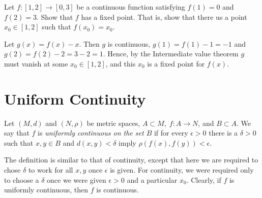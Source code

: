 \documentclass[../main-sheet.tex]{subfiles}
\begin{document}
\begin{prob}
    Let $ f:[1,2]\to[0,3] $ be a continuous function satisfying $ f(1)=0 $ and $ f(2)=3 $. Show that $ f $ has a fixed point. That is, show that there us a point $ x_0 \in [1,2] $ such that $ f(x_0)=x_0 $.
\end{prob}
\begin{soln}
    Let $ g(x)=f(x)-x $. Then $ g $ is continuous, $ g(1)=f(1)-1=-1$ and $ g(2)=f(2)-2=3-2=1 $. Hence, by the Intermediate value theorem $ g $ must vanish at some $ x_0\in[1,2] $, and this $ x_0 $ is a fixed point for $ f(x) $.
\end{soln}
\section{Uniform Continuity}
\begin{defn}
    Let $ (M,d) $ and $ (N,\rho) $ be metric spaces, $ A\subset M,\; f :A\to N $, and $ B\subset A $. We say that $ f $ is \emph{uniformly continuous on the set $ B $} if for every $ \epsilon>0 $ there is a $ \delta>0 $ such that $ x,y\in B $ and $ d(x,y)<\delta $ imply $ \rho(f(x),f(y))<\epsilon $.
\end{defn}

The definition is similar to that of continuity, except that here we are required to chose $ \delta  $ to work for all $ x,y $ once $ \epsilon  $ is given. For continuity, we were required only to choose a $ \delta  $ once we were given $ \epsilon>0 $ and a particular $ x_0 $. Clearly, if $ f $ is uniformly continuous, then $ f $ is continuous.\\
\end{document}
